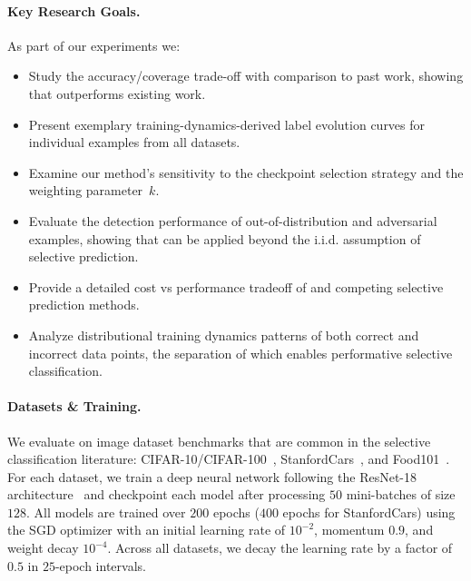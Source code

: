\paragraph{Key Research Goals.} As part of our experiments we:
\begin{itemize}
    \item Study the accuracy/coverage trade-off with comparison to past work, showing that \sptd outperforms existing work.
    \item Present exemplary training-dynamics-derived label evolution curves for individual examples from all datasets.
    \item Examine our method's sensitivity to the checkpoint selection strategy and the weighting parameter~$k$.
    \item Evaluate the detection performance of out-of-distribution and adversarial examples, showing that \sptd can be applied beyond the i.i.d. assumption of selective prediction.
    \item Provide a detailed cost vs performance tradeoff of \sptd and competing selective prediction methods.
    \item Analyze distributional training dynamics patterns of both correct and incorrect data points, the separation of which enables performative selective classification.
\end{itemize} 

\paragraph{Datasets \& Training.} We evaluate \sptd on image dataset benchmarks that are common in the selective classification literature: CIFAR-10/CIFAR-100~\citep{krizhevsky2009learning}, StanfordCars~\citep{krause20133d}, and Food101~\citep{bossard14}. For each dataset, we train a deep neural network following the ResNet-18 architecture~\citep{he2016deep} and checkpoint each model after processing $50$ mini-batches of size $128$. All models are trained over $200$ epochs ($400$ epochs for StanfordCars) using the SGD optimizer with an initial learning rate of $10^{-2}$, momentum $0.9$, and weight decay $10^{-4}$. Across all datasets, we decay the learning rate by a factor of $0.5$ in $25$-epoch intervals.

